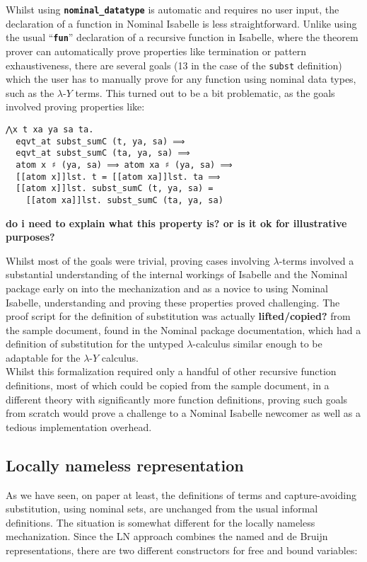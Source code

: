 \documentclass[a4paper, 12pt, twoside]{style/ociamthesis}
\theoremstyle{plain}
\theoremstyle{definition}
\theoremstyle{remark}
\newcommand{\lamy}{\lambda\text{-}Y}
\begin{document}
Whilst using \textbf{\texttt{nominal\_datatype}} is automatic and
requires no user input, the declaration of a function in Nominal
Isabelle is less straightforward. Unlike using the usual
``\textbf{\texttt{fun}}'' declaration of a recursive function in
Isabelle, where the theorem prover can automatically prove properties
like termination or pattern exhaustiveness, there are several goals (13
in the case of the \texttt{subst} definition) which the user has to
manually prove for any function using nominal data types, such as the
\(\lamy\) terms. This turned out to be a bit problematic, as the goals
involved proving properties like:

\begin{verbatim}
⋀x t xa ya sa ta.
  eqvt_at subst_sumC (t, ya, sa) ⟹
  eqvt_at subst_sumC (ta, ya, sa) ⟹
  atom x ♯ (ya, sa) ⟹ atom xa ♯ (ya, sa) ⟹ 
  [[atom x]]lst. t = [[atom xa]]lst. ta ⟹ 
  [[atom x]]lst. subst_sumC (t, ya, sa) = 
    [[atom xa]]lst. subst_sumC (ta, ya, sa)
\end{verbatim}

\textbf{do i need to explain what this property is? or is it ok for
illustrative purposes?}

Whilst most of the goals were trivial, proving cases involving
\(\lambda\)-terms involved a substantial understanding of the internal
workings of Isabelle and the Nominal package early on into the
mechanization and as a novice to using Nominal Isabelle, understanding
and proving these properties proved challenging. The proof script for
the definition of substitution was actually \textbf{lifted/copied?} from
the sample document, found in the Nominal package documentation, which
had a definition of substitution for the untyped \(\lambda\)-calculus
similar enough to be adaptable for the \(\lamy\) calculus.\\
Whilst this formalization required only a handful of other recursive
function definitions, most of which could be copied from the sample
document, in a different theory with significantly more function
definitions, proving such goals from scratch would prove a challenge to
a Nominal Isabelle newcomer as well as a tedious implementation
overhead.

\subsection{Locally nameless
representation}\label{locally-nameless-representation}

As we have seen, on paper at least, the definitions of terms and
capture-avoiding substitution, using nominal sets, are unchanged from
the usual informal definitions. The situation is somewhat different for
the locally nameless mechanization. Since the LN approach combines the
named and de Bruijn representations, there are two different
constructors for free and bound variables:
\end{document}
